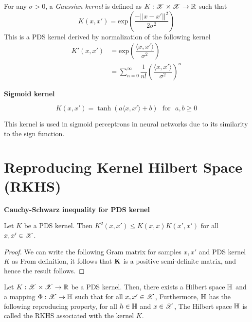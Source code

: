 \documentclass[a4paper,english,12pt]{article}
\begin{document}
\begin{exmp}
For any $\sigma > 0$, a \textit{Gaussian kernel} is defined as $K: \mathscr{X}\times\mathscr{X}\to\mathbb{R}$ such that
\[K(x,x') = \text{exp}\left(\dfrac{-||x-x'||^2}{2 \sigma^2}\right)\]
This is a PDS kernel derived by normalization of the following kernel
\begin{align*}
K'(x,x') &= \text{exp}\left(\dfrac{\langle x, x' \rangle}{\sigma^2}\right) \\
&= \sum_{n=0}^{\infty} \dfrac{1}{n!}\left(\dfrac{\langle x, x' \rangle}{\sigma^2}\right)^n
\end{align*}
\end{exmp}

\begin{exmp}
	\textbf{Sigmoid kernel}

\[K(x,x') = \tanh(a \langle x,x' \rangle + b) ~~~ \text{for} ~~~ a,b \ge 0\]

This kernel is used in sigmoid perceptrons in neural networks due to its similarity to the sign function.
\end{exmp}

\section{Reproducing Kernel Hilbert Space (RKHS)}

\begin{lem}
	\textbf{Cauchy-Schwarz inequality for PDS kernel}

Let $K$ be a PDS kernel. Then $K^2(x,x') \le K(x,x)K(x',x')$ for all $x, x' \in \mathscr{X}$.
\end{lem}

\begin{proof}
We can write the following Gram matrix for samples $x,x'$ and PDS kernel $K$ as 
From definition, it follows that $\mathbf{K}$ is a positive semi-definite matrix, and hence the result follows. 
\end{proof}

\begin{thm}[RKHS] 
Let $K: \mathscr{X} \times \mathscr{X} \to \mathbb{R}$ be a PDS kernel. 
Then, there exists a Hilbert space $\mathbb{H}$ and a mapping $\Phi: \mathscr{X} \to \mathbb{H}$ such that for all $x, x' \in \mathscr{X}$,
Furthermore, $\mathbb{H}$ has the following reproducing property, for all $h \in \mathbb{H}$ and $x \in \mathscr{X}$, 
The Hilbert space $\mathbb{H}$ is called the RKHS associated with the kernel $K$. 
\end{thm}
\end{document}
